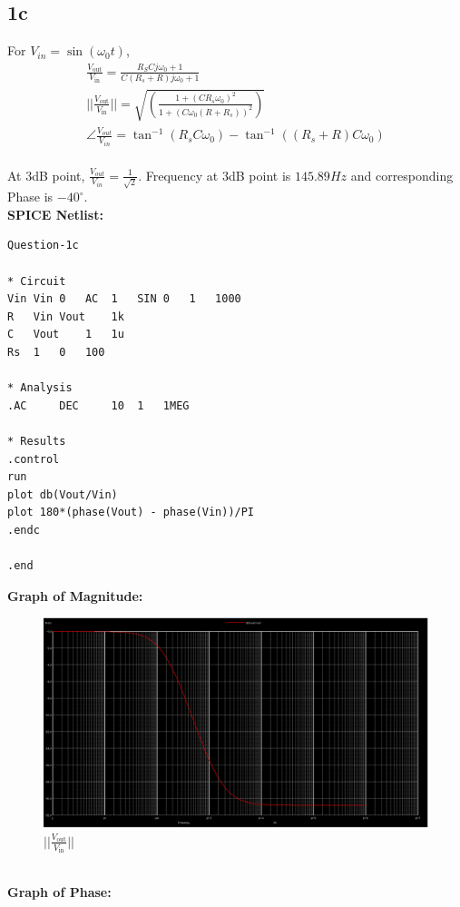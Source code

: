 \documentclass{article}
\begin{document}
\subsection{1c}
For $V_{in} = \sin(\omega_0 t)$,\\
\begin{align}
    \frac{V_{\text {out}}}{V_{\text {in}}}=\frac{R_{S}Cj\omega_0+1}{C(R_{s}+R)j\omega_0+1} \\
    ||\frac{V_{\text {out}}}{V_{\text {in}}}|| = \sqrt{\left(\frac{1 + (CR_s\omega_0)^2}{1 + (C\omega_0(R+R_s))^2}\right)} \\
    \angle \frac{V_{out}}{V_{in}} = \tan ^{-1}\left({R_{s}C\omega_{0}}\right) - \tan ^{-1}\left({(R_{s} + R)C\omega_{0}}\right)
\end{align}\\
At 3dB point, $\frac{V_{out}}{V_{in}} = \frac{1}{\sqrt{2}}$. Frequency at 3dB point is $145.89 Hz$ and corresponding Phase is $-40^{\circ}$.\\
\textbf{SPICE Netlist:}
\begin{lstlisting}
Question-1c

* Circuit
Vin	Vin	0	AC	1	SIN	0	1	1000
R	Vin	Vout	1k
C	Vout	1	1u
Rs	1	0	100

* Analysis
.AC 	DEC 	10	1	1MEG

* Results
.control
run
plot db(Vout/Vin)
plot 180*(phase(Vout) - phase(Vin))/PI
.endc

.end
\end{lstlisting}
\textbf{Graph of Magnitude:}
\begin{figure}[!ht]
    \centering
    \includegraphics[scale=0.23]{Images/1c_1.png}
    \caption{$||\frac{V_{\text {out}}}{V_{\text {in}}}||$}
\end{figure}\\
\textbf{Graph of Phase:}
\end{document}
